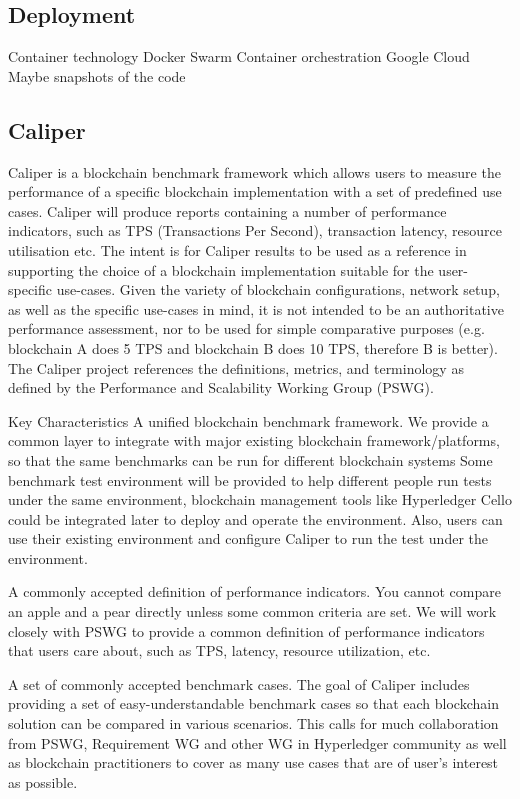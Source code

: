 \subsection{Deployment}
Container technology
Docker Swarm Container orchestration
Google Cloud
Maybe snapshots of the code


\subsection{Caliper}

Caliper is a blockchain benchmark framework which allows users to measure the performance of a specific blockchain implementation with a set of predefined use cases. Caliper will produce reports containing a number of performance indicators, such as TPS (Transactions Per Second), transaction latency, resource utilisation etc. The intent is for Caliper results to be used as a reference in supporting the choice of a blockchain implementation suitable for the user-specific use-cases. Given the variety of blockchain configurations, network setup, as well as the specific use-cases in mind, it is not intended to be an authoritative performance assessment, nor to be used for simple comparative purposes (e.g. blockchain A does 5 TPS and blockchain B does 10 TPS, therefore B is better). The Caliper project references the definitions, metrics, and terminology as defined by the Performance and Scalability Working Group (PSWG).

Key Characteristics
A unified blockchain benchmark framework. We provide a common layer to integrate with major existing blockchain framework/platforms, so that the same benchmarks can be run for different blockchain systems Some benchmark test environment will be provided to help different people run tests under the same environment, blockchain management tools like Hyperledger Cello could be integrated later to deploy and operate the environment. Also, users can use their existing environment and configure Caliper to run the test under the environment.

A commonly accepted definition of performance indicators. You cannot compare an apple and a pear directly unless some common criteria are set. We will work closely with PSWG to provide a common definition of performance indicators that users care about, such as TPS, latency, resource utilization, etc.

A set of commonly accepted benchmark cases. The goal of Caliper includes providing a set of easy-understandable benchmark cases so that each blockchain solution can be compared in various scenarios. This calls for much collaboration from PSWG, Requirement WG and other WG in Hyperledger community as well as blockchain practitioners to cover as many use cases that are of user’s interest as possible.


